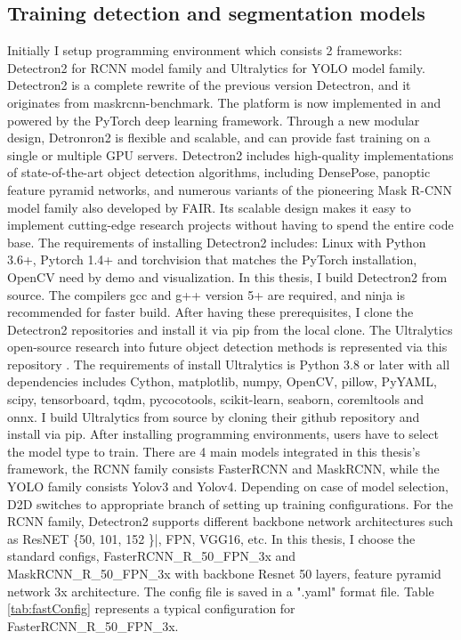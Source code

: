 \subsection{Training detection and segmentation models}
Initially I setup programming environment which consists 2 frameworks: Detectron2 \cite{wu2019detectron2} for RCNN model family and Ultralytics \cite{ultralytics} for YOLO model family.
Detectron2 is a complete rewrite of the previous version Detectron, and it originates from maskrcnn-benchmark. The platform is now implemented in and powered by the PyTorch deep learning framework. Through a new modular design, Detronron2 is flexible and scalable, and can provide fast training on a single or multiple GPU servers. Detectron2 includes high-quality implementations of state-of-the-art object detection algorithms, including DensePose, panoptic feature pyramid networks, and numerous variants of the pioneering Mask R-CNN model family also developed by FAIR. Its scalable design makes it easy to implement cutting-edge research projects without having to spend the entire code base. The requirements of installing Detectron2 includes: Linux with Python 3.6+, Pytorch 1.4+ and torchvision that matches the PyTorch installation, OpenCV need by demo and visualization. In this thesis, I build Detectron2 from source. The compilers gcc and g++ version 5+ are required, and ninja is recommended for faster build. After having these prerequisites, I clone the Detectron2 repositories and install it via pip from the local clone.
The Ultralytics open-source research into future object detection methods is represented via this repository \cite{ultralytics}. The requirements of install Ultralytics is Python 3.8 or later with all dependencies includes Cython, matplotlib, numpy, OpenCV, pillow, PyYAML, scipy, tensorboard, tqdm, pycocotools, scikit-learn, seaborn, coremltools and onnx. I build Ultralytics from source by cloning their github repository and install via pip.
After installing programming environments, users have to select the model type to train. There are 4 main models integrated in this thesis's framework, the RCNN family consists FasterRCNN and MaskRCNN, while the YOLO family consists Yolov3 and Yolov4. Depending on case of model selection, D2D switches to appropriate branch of setting up training configurations. For the RCNN family, Detectron2 supports different backbone network architectures such as ResNET \{50, 101, 152 \}|, FPN, VGG16, etc. In this thesis, I choose the standard configs, FasterRCNN\_R\_50\_FPN\_3x and MaskRCNN\_R\_50\_FPN\_3x with backbone Resnet 50 layers, feature pyramid network 3x architecture. The config file is saved in a ".yaml" format file. Table \ref{tab:fastConfig} represents a typical configuration for FasterRCNN\_R\_50\_FPN\_3x.
